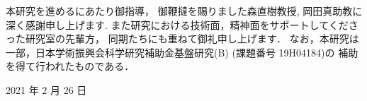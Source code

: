 \newpage
\changeindent{0cm}
\acknowledgements
\changeindent{2cm}

本研究を進めるにあたり御指導， 御鞭撻を賜りました森直樹教授,
岡田真助教に深く感謝申し上げます.
また研究における技術面，精神面をサポートしてくださった研究室の先輩方，
同期たちにも重ねて御礼申し上げます．
なお，本研究は一部，日本学術振興会科学研究補助金基盤研究(B) (課題番号 19H04184)の
補助を得て行われたものである．

\begin{flushright}
	2021 年 2 月 26 日
\end{flushright}
